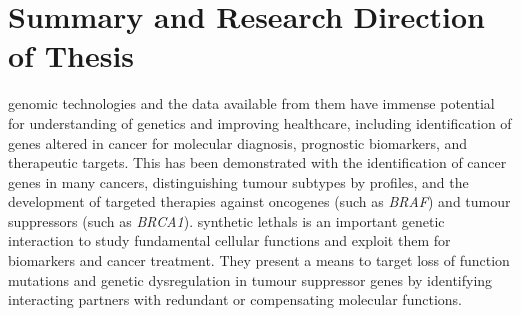 





\section{Summary and Research Direction of Thesis}

\Gls{genomic} technologies and the data available from them have immense potential for understanding of genetics and improving healthcare, including identification of genes altered in cancer for molecular diagnosis, prognostic biomarkers, and therapeutic targets. This has been demonstrated with the identification of \glspl{cancer gene} in many cancers, distinguishing tumour subtypes by  profiles, and the development of targeted therapies against \glspl{oncogene} (such as \textit{BRAF}) and \glspl{tumour suppressor} (such as \textit{BRCA1}). \Glspl{synthetic lethal} is an important genetic interaction to study fundamental cellular functions and exploit them for biomarkers and cancer treatment. They present a means to target loss of function \glspl{mutation} and genetic dysregulation in \gls{tumour suppressor} genes by identifying interacting partners with redundant or compensating molecular functions.  

